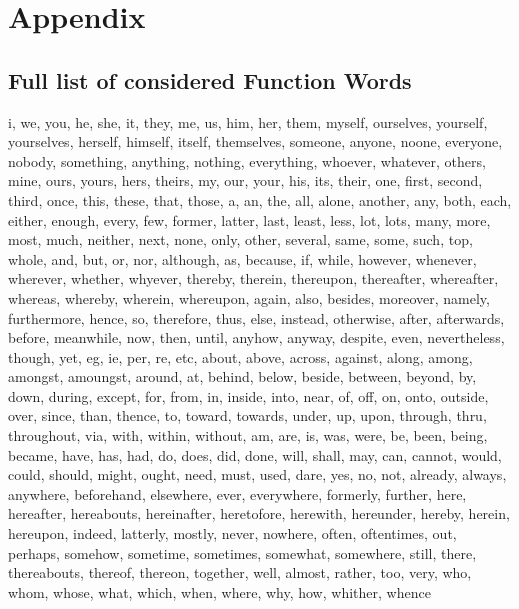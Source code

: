 \section*{Appendix}

\subsection*{Full list of considered Function Words}
i, we, you, he, she, it, they, me, us, him, her, them, myself, ourselves, yourself, yourselves, herself, himself, itself, themselves, someone, anyone, noone, everyone, nobody, something, anything, nothing, everything, whoever, whatever, others, mine, ours, yours, hers, theirs, my, our, your, his, its, their, one, first, second, third, once, this, these, that, those, a, an, the, all, alone, another, any, both, each, either, enough, every, few, former, latter, last, least, less, lot, lots, many, more, most, much, neither, next, none, only, other, several, same, some, such, top, whole, and, but, or, nor, although, as, because, if, while, however, whenever, wherever, whether, whyever, thereby, therein, thereupon, thereafter, whereafter, whereas, whereby, wherein, whereupon, again, also, besides, moreover, namely, furthermore, hence, so, therefore, thus, else, instead, otherwise, after, afterwards, before, meanwhile, now, then, until, anyhow, anyway, despite, even, nevertheless, though, yet, eg, ie, per, re, etc, about, above, across, against, along, among, amongst, amoungst, around, at, behind, below, beside, between, beyond, by, down, during, except, for, from, in, inside, into, near, of, off, on, onto, outside, over, since, than, thence, to, toward, towards, under, up, upon, through, thru, throughout, via, with, within, without, am, are, is, was, were, be, been, being, became, have, has, had, do, does, did, done, will, shall, may, can, cannot, would, could, should, might, ought, need, must, used, dare, yes, no, not, already, always, anywhere, beforehand, elsewhere, ever, everywhere, formerly, further, here, hereafter, hereabouts, hereinafter, heretofore, herewith, hereunder, hereby, herein, hereupon, indeed, latterly, mostly, never, nowhere, often, oftentimes, out, perhaps, somehow, sometime, sometimes, somewhat, somewhere, still, there, thereabouts, thereof, thereon, together, well, almost, rather, too, very, who, whom, whose, what, which, when, where, why, how, whither, whence

